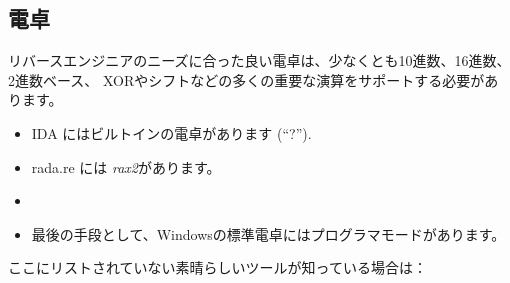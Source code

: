 
\subsection{電卓}

リバースエンジニアのニーズに合った良い電卓は、少なくとも10進数、16進数、2進数ベース、
XORやシフトなどの多くの重要な演算をサポートする必要があります。

\begin{itemize}

\item IDA にはビルトインの電卓があります (``?'').

\item rada.re には \emph{rax2}があります。

\item \ProgCalcURL

\item 最後の手段として、Windowsの標準電卓にはプログラマモードがあります。

\end{itemize}


ここにリストされていない素晴らしいツールが知っている場合は：\\
\TT{\EMAILS}

